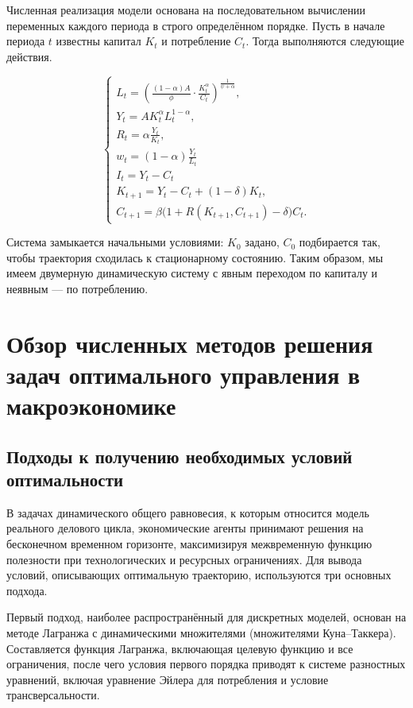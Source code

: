 \documentclass[12pt,a4paper]{report}   %
\begin{document}
            Численная реализация модели основана на последовательном вычислении переменных каждого периода в строго определённом порядке. Пусть в начале периода $t$ известны капитал $K_t$ и потребление $C_t$. Тогда выполняются следующие действия.
            
            \begin{equation}
            \begin{cases}
            L_t = \left( \frac{(1-\alpha)A}{\phi} \cdot \frac{K_t^{\alpha}}{C_t} \right)^{\frac{1}{\psi+\alpha}}, \\[4pt]
            Y_t = A K_t^{\alpha} L_t^{1-\alpha}, \\[4pt]
            R_t = \alpha \frac{Y_t}{K_t}, \\[4pt]
            w_t = (1-\alpha) \frac{Y_t}{L_t}  \\[4pt]
            I_t = Y_t - C_t \\[4pt]
            K_{t+1} = Y_t - C_t + (1-\delta) K_t, \\[4pt]
            C_{t+1} = \beta \bigl(1 + R(K_{t+1}, C_{t+1}) - \delta \bigr) C_t.
            \end{cases}
            \end{equation}

            Система замыкается начальными условиями: $K_0$ задано, $C_0$ подбирается так, чтобы траектория сходилась к стационарному состоянию. Таким образом, мы имеем двумерную динамическую систему с явным переходом по капиталу и неявным — по потреблению.

    \chapter{Обзор численных методов решения задач оптимального управления в макроэкономике}

        \section{Подходы к получению необходимых условий оптимальности}

            В задачах динамического общего равновесия, к которым относится модель реального делового цикла, экономические агенты принимают решения на бесконечном временном горизонте, максимизируя межвременную функцию полезности при технологических и ресурсных ограничениях. Для вывода условий, описывающих оптимальную траекторию, используются три основных подхода.

            Первый подход, наиболее распространённый для дискретных моделей, основан на методе Лагранжа с динамическими множителями (множителями Куна--Таккера). Составляется функция Лагранжа, включающая целевую функцию и все ограничения, после чего условия первого порядка приводят к системе разностных уравнений, включая уравнение Эйлера для потребления и условие трансверсальности.
\end{document}
